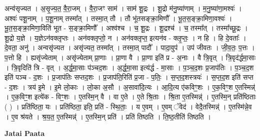 \documentclass[17pt]{extarticle}
\begin{document}
अन्व॑सृज्यत । अ॒सृ॒ज्य॒त॒ वै॒रा॒जम् । वै॒रा॒जꣳ साम॑ । साम॑ शू॒द्रः । शू॒द्रो म॑नु॒ष्या॑णाम् । म॒नु॒ष्या॑णा॒मश्वः॑ । अश्वः॑ पशू॒नाम् । प॒शू॒नाम् तस्मा᳚त् । तस्मा॒त् तौ । तौ भू॑तसङ्‍क्रा॒मिणौ᳚ । भू॒त॒स॒ङ्‍क्रा॒मिणा॒वश्वः॑ । भू॒त॒स॒ङ्‍क्रा॒मिणा॒विति॑ भूत - स॒ङ्‍क्रा॒मिणौ᳚ । अश्व॑श्च । च॒ शू॒द्रः । शू॒द्रश्च॑ । च॒ तस्मा᳚त् । तस्मा᳚च्छू॒द्रः । शू॒द्रो य॒ज्ञे । य॒ज्ञेऽन॑वक्लृप्तः । अन॑वक्लृप्तो॒ न । अन॑वक्लृप्त॒ इत्यन॑व - क्लृ॒प्तः॒ । न हि । हि दे॒वताः᳚ । दे॒वता॒ अनु॑ । अन्वसृ॑ज्यत । असृ॑ज्यत॒ तस्मा᳚त् । तस्मा॒त् पादौ᳚ । पादा॒वुप॑ । उप॑ जीवतः । जी॒व॒तः॒ प॒त्तः । प॒त्तो हि । ह्यसृ॑ज्येताम् । असृ॑ज्येताम् प्रा॒णाः । प्रा॒णा वै । प्रा॒णा इति॑ प्र - अ॒नाः । वै त्रि॒वृत् । त्रि॒वृद॑र्द्धमा॒साः । त्रि॒वृदिति॑ त्रि - वृत् । अ॒र्द्ध॒मा॒साः प॑ञ्चद॒शः । अ॒र्द्ध॒मा॒सा इत्य॑र्द्ध - मा॒साः । प॒ञ्च॒द॒शः प्र॒जाप॑तिः । प॒ञ्च॒द॒श इति॑ पञ्च - द॒शः । प्र॒जाप॑तिः सप्तद॒शः । प्र॒जाप॑ति॒रिति॑ प्र॒जा - प॒तिः॒ । स॒प्त॒द॒शस्त्रयः॑ । स॒प्त॒द॒श इति॑ सप्त - द॒शः । त्रय॑ इ॒मे । इ॒मे लो॒काः । लो॒का अ॒सौ । अ॒सावा॑दि॒त्यः । आ॒दि॒त्य ए॑कविꣳ॒॒शः । ए॒क॒विꣳ॒॒श ए॒तस्मिन्न्॑ । ए॒क॒विꣳ॒॒श इत्ये॑क - विꣳ॒॒शः । ए॒तस्मि॒न् वै । वा ए॒ते । ए॒ते श्रि॒ताः । श्रि॒ता ए॒तस्मिन्न्॑ । ए॒तस्मि॒न् प्रति॑ष्ठिताः ( ) । प्रति॑ष्ठिता॒ यः । प्रति॑ष्ठिता॒ इति॒ प्रति॑ - स्थि॒ताः॒ । य ए॒वम् । ए॒वम् ॅवेद॑ । वेदै॒तस्मिन्न्॑ । ए॒तस्मि॑न्ने॒व । ए॒व श्र॑यते । श्र॒य॒त॒ ए॒तस्मिन्न्॑ । ए॒तस्मि॒न् प्रति॑ । प्रति॑ तिष्ठति । ति॒ष्ठ॒तीति॑ तिष्ठति । \newline

\textbf{Jatai Paata} \newline
\end{document}
